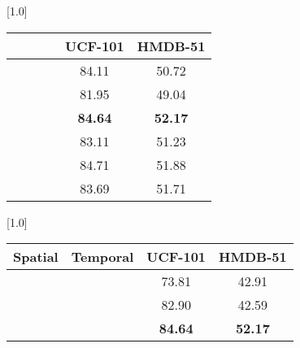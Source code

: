 \documentclass[10pt,twocolumn,letterpaper]{article}
\newcommand{\cmark}{\ding{51}}\newcommand{\xmark}{\ding{55}}\newcommand{\bx}{{\bm x}}
\begin{document}
\begin{table*}[t]
\begin{minipage}{.55\textwidth}
	\centering\small
    \caption{\textbf{View Correspondences.} Predicting local to global and global to global views remains optimal over any other combination.}
	\setlength{\tabcolsep}{8pt}
	\scalebox{1.0}[1.0]{
	\begin{tabular}{c|c|c|c|c|c}
		\toprule 
		\rowcolor{Gray}
		  &   &   &  & UCF-101     & HMDB-51  \\  \midrule
		\cmark   & \xmark   & \xmark   & \xmark  & 84.11   & 50.72 \\ 
		\xmark   & \cmark   & \xmark   & \xmark  & 81.95   & 49.04 \\ 
		\cmark   & \cmark   & \xmark   & \xmark  & \textbf{84.64}   & \textbf{52.17} \\
		\cmark   & \cmark   & \cmark   & \xmark  & 83.11   & 51.23 \\
		\cmark   & \cmark   & \xmark   & \cmark  & 84.71   & 51.88 \\
		\cmark   & \cmark   & \cmark   & \cmark  & 83.69   & 51.71 \\ \bottomrule
	\end{tabular}
	}
\label{tbl:ablation_correspondences}
\end{minipage}
\hfill
\begin{minipage}{.42\textwidth}
	\centering\small
\caption{\textbf{Spatial vs Temporal variations.}  Cross-view correspondences with varying field of view along both spatial and temporal dimensions lead to optimal results. Temporal variations between views has more effect than applying only spatial variation.}
	\setlength{\tabcolsep}{7pt}
	\scalebox{1.0}[1.0]{
	\begin{tabular}{c|c|c|c}
		\toprule
		\rowcolor{Gray} 
		Spatial  & Temporal & UCF-101     & HMDB-51 \\ \midrule
		\cmark   & \xmark   & 73.81   & 42.91   \\ 
		\xmark   & \cmark   & 82.90   & 42.59   \\ 
		\cmark   & \cmark   & \textbf{84.64}   & \textbf{52.17}   \\ \bottomrule
	\end{tabular}}
\label{tbl:ablation_st}
\end{minipage}
\end{table*}
\end{document}
